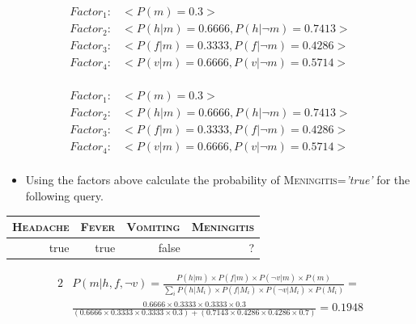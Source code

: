 \documentclass[xcolor={table}]{beamer}
\newcommand{\featN}[1]{\textsc{#1}}
\newcommand{\featL}[1]{\textit{'#1'}}
\begin{document}
 \begin{frame} 
\begin{equation*}
\begin{alignedat}{2}
Factor_1: & <P(m)=0.3>\\
Factor_2: & < P(h|m)=0.6666, P(h|\lnot m)=0.7413 >\\
Factor_3: & < P(f|m)=0.3333, P(f|\lnot m)=0.4286 >\\
Factor_4: & < P(v|m)=0.6666, P(v|\lnot m)=0.5714 >\\
\end{alignedat}
\end{equation*}
\end{frame} 

\begin{frame}
\begin{equation*}
\begin{alignedat}{2}
Factor_1: & <P(m)=0.3>\\
Factor_2: & < P(h|m)=0.6666, P(h|\lnot m)=0.7413 >\\
Factor_3: & < P(f|m)=0.3333, P(f|\lnot m)=0.4286 >\\
Factor_4: & < P(v|m)=0.6666, P(v|\lnot m)=0.5714 >\\
\end{alignedat}
\end{equation*}
\begin{itemize}
	\item Using the factors above calculate the probability of \featN{Meningitis}=\featL{true} for the following query.
\end{itemize}
\begin{table}
\begin{footnotesize}
\begin{tabular}{rrrr}
\hline
\featN{Headache} & \featN{Fever} & \featN{Vomiting} & \featN{Meningitis}\\
\hline
true & true & false & ?\\
\hline
\end{tabular}
\end{footnotesize}
\end{table}
\end{frame}


 \begin{frame} 
\begin{footnotesize}
\begin{alignat*}{2}
&P(m| h, f, \lnot v)=\frac{ P(h|m)  \times P(f|m) \times P(\lnot v|m) \times P(m)}{ \sum_{i}  P(h|M_i) \times P(f |M_i) \times P(\lnot v|M_i) \times P(M_i)}=\\
&\frac{ 0.6666 \times 0.3333 \times 0.3333 \times 0.3 }{( 0.6666 \times 0.3333 \times 0.3333 \times  0.3 ) + ( 0.7143 \times 0.4286\times 0.4286 \times 0.7 ) }= 0.1948
\end{alignat*}
\end{footnotesize}
\end{frame} 
\end{document}
